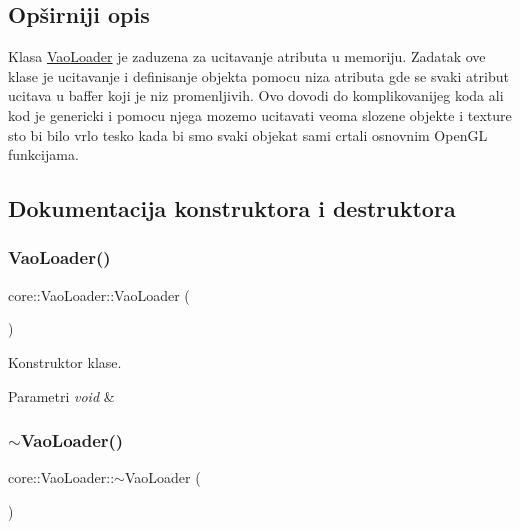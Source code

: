 \subsection{Opširniji opis}
Klasa \hyperlink{classcore_1_1VaoLoader}{Vao\+Loader} je zaduzena za ucitavanje atributa u memoriju. Zadatak ove klase je ucitavanje i definisanje objekta pomocu niza atributa gde se svaki atribut ucitava u baffer koji je niz promenljivih. Ovo dovodi do komplikovanijeg koda ali kod je genericki i pomocu njega mozemo ucitavati veoma slozene objekte i texture sto bi bilo vrlo tesko kada bi smo svaki objekat sami crtali osnovnim Open\+GL funkcijama. 

\subsection{Dokumentacija konstruktora i destruktora}
\mbox{\label{classcore_1_1VaoLoader_ab025be7312c274b9737b19d308bd5845}} 
\subsubsection{\texorpdfstring{Vao\+Loader()}{VaoLoader()}}
{\footnotesize\ttfamily core\+::\+Vao\+Loader\+::\+Vao\+Loader (\begin{DoxyParamCaption}{ }\end{DoxyParamCaption})}



Konstruktor klase. 


\begin{DoxyParams}{Parametri}
{\em void} & \\
\hline
\end{DoxyParams}
\mbox{\label{classcore_1_1VaoLoader_a1b522bb4b83dbe751783fee04ac712d3}} 
\subsubsection{\texorpdfstring{$\sim$\+Vao\+Loader()}{~VaoLoader()}}
{\footnotesize\ttfamily core\+::\+Vao\+Loader\+::$\sim$\+Vao\+Loader (\begin{DoxyParamCaption}{ }\end{DoxyParamCaption})}



